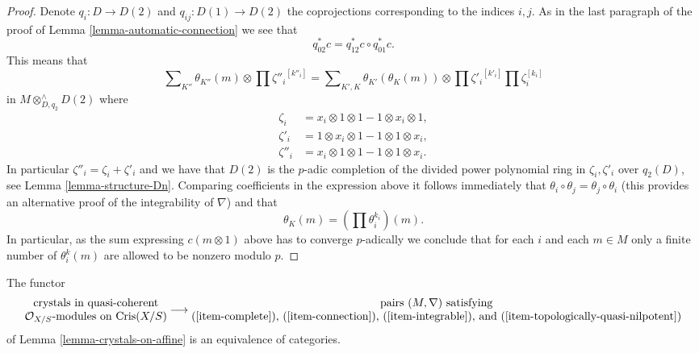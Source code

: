 \begin{proof}
\medskip\noindent
Denote $q_i : D \to D(2)$ and $q_{ij} : D(1) \to D(2)$ the coprojections
corresponding to the indices $i, j$. As in the last paragraph of the proof of
Lemma \ref{lemma-automatic-connection}
we see that
$$
q_{02}^*c = q_{12}^*c \circ q_{01}^*c.
$$
This means that
$$
\sum\nolimits_{K''} \theta_{K''}(m) \otimes \prod {\zeta''_i}^{[k''_i]}
=
\sum\nolimits_{K', K} \theta_{K'}(\theta_K(m))
\otimes \prod {\zeta'_i}^{[k'_i]} \prod \zeta_i^{[k_i]}
$$
in $M \otimes^\wedge_{D, q_2} D(2)$ where
\begin{align*}
\zeta_i & = x_i \otimes 1 \otimes 1 - 1 \otimes x_i \otimes 1,\\
\zeta'_i & = 1 \otimes x_i \otimes 1 - 1 \otimes 1 \otimes x_i,\\
\zeta''_i & = x_i \otimes 1 \otimes 1 - 1 \otimes 1 \otimes x_i.
\end{align*}
In particular $\zeta''_i = \zeta_i + \zeta'_i$ and we have that
$D(2)$ is the $p$-adic completion of the divided power polynomial
ring in $\zeta_i, \zeta'_i$ over $q_2(D)$, see Lemma \ref{lemma-structure-Dn}.
Comparing coefficients in the expression above it follows immediately that
$\theta_i \circ \theta_j = \theta_j \circ \theta_i$
(this provides an alternative proof of the integrability of $\nabla$) and that
$$
\theta_K(m) = (\prod \theta_i^{k_i})(m).
$$
In particular, as the sum expressing $c(m \otimes 1)$ above has to converge
$p$-adically we conclude that for each $i$ and each $m \in M$ only a finite
number of $\theta_i^k(m)$ are allowed to be nonzero modulo $p$.
\end{proof}

\begin{proposition}
\label{proposition-crystals-on-affine}
The functor
$$
\begin{matrix}
\text{crystals in quasi-coherent} \\
\mathcal{O}_{X/S}\text{-modules on }\text{Cris}(X/S)
\end{matrix}
\longrightarrow
\begin{matrix}
\text{pairs }(M, \nabla)\text{ satisfying} \\
\text{(\ref{item-complete}), (\ref{item-connection}),
(\ref{item-integrable}), and (\ref{item-topologically-quasi-nilpotent})}
\end{matrix}
$$
of Lemma \ref{lemma-crystals-on-affine}
is an equivalence of categories.
\end{proposition}

